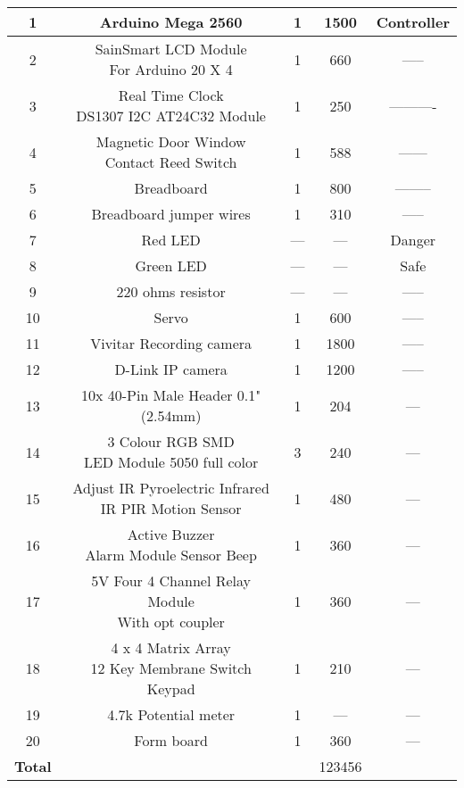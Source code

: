 \documentclass[margin, centered]{res}
\begin{document}
\begin{resume}
\begin{table}[ht]
\begin{tabular}{|c |c |c |c |c|}
1 & Arduino Mega 2560 & 1 & 1500 & Controller\\ \hline
2 & \makecell{SainSmart LCD Module \\ For Arduino 20 X 4} & 1 & 660 & -----\\ \hline
3 & \makecell{Real Time Clock \\ DS1307 I2C AT24C32 Module} & 1 & 250 & ----------\\ \hline
4 & \makecell{Magnetic Door Window \\ Contact Reed Switch} & 1 & 588 & ------ \\ \hline
5 & Breadboard & 1 & 800 & --------\\ \hline
6 & Breadboard jumper wires & 1 & 310 & -----\\ \hline
7 & Red LED & --- & --- & Danger\\ \hline
8 & Green LED & --- & --- & Safe\\ \hline
9 & 220 ohms resistor & --- & --- & -----\\ \hline
10 & Servo & 1 & 600 & -----\\ \hline
11 & Vivitar Recording camera & 1 & 1800 & -----\\ \hline
12 & D-Link IP camera & 1 & 1200 & -----\\ \hline
13 & 10x 40-Pin Male Header 0.1" (2.54mm) & 1 & 204 & --- \\ \hline
14 & \makecell{3 Colour RGB SMD \\LED Module 5050 full color} & 3 & 240 & ---\\ \hline
15 & \makecell{Adjust IR Pyroelectric Infrared \\IR PIR Motion Sensor} & 1 & 480 & ---\\ \hline
16 & \makecell{Active Buzzer \\ Alarm Module Sensor Beep} & 1 & 360 & ---\\ \hline
17 & \makecell{5V Four 4 Channel Relay Module \\With opt coupler} & 1 & 360 & ---\\ \hline
18 & \makecell{4 x 4 Matrix Array \\12 Key Membrane Switch Keypad} & 1 & 210 & ---\\ \hline
19 & 4.7k Potential meter & 1 & --- & ---\\ \hline
20 & Form board & 1 & 360 & ---\\ 
\hline
\textbf{Total} &   &   & 123456 & \\
\hline

\end{tabular}
\end{table}


\end{resume}
\end{document}
